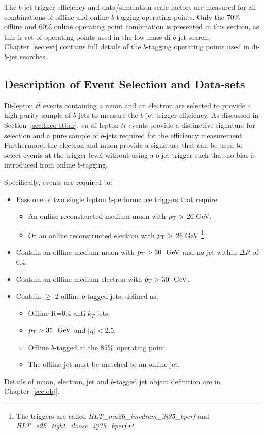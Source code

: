 The $b$-jet trigger efficiency and data/simulation scale factors are measured for all combinations of offline and online $b$-tagging operating points.
Only the 70\% offline and 60\% online operating point combination is presented in this section,
as this is set of operating points used in the low mass di-$b$-jet search;
Chapter~\ref{sec:evt} contains full details of the $b$-tagging operating points used in di-$b$-jet searches.

\subsection{Description of Event Selection and Data-sets}
\label{sec:trig-evtSel}

Di-lepton $t\bar{t}$ events containing a muon and an electron are selected to provide a high purity sample of $b$-jets to measure the $b$-jet trigger efficiency.
As discussed in Section~\ref{sec:theo-ttbar}, 
$e\mu$ di-lepton $t\bar{t}$ events provide a distinctive signature for selection and a pure sample of $b$-jets required for the efficiency measurement.
Furthermore, the electron and muon provide a signature that can be used to select events at the trigger-level without using a $b$-jet trigger
such that no bias is introduced from online $b$-tagging.

\noindent
Specifically, events are required to:
\vspace{-1em}
\begin{itemize}
\item Pass one of two single lepton $b$-performance triggers that require
    \begin{itemize}[label={$-$}]
    \item An online reconstructed medium muon with $p_{\mathrm{T}} >$ 26 GeV.
    \item Or an online reconstructed electron with $p_{\mathrm{T}} >$ 26 GeV \footnote{The triggers are called \textit{HLT\_mu26\_imedium\_2j35\_bperf} and \textit{HLT\_e26\_tight\_iloose\_2j35\_bperf}.}.
    \end{itemize}
\item Contain an offline medium muon with $\pT>30~\GeV$ and no jet within $\Delta R$ of 0.4.
\item Contain an offline medium electron with $\pT>30~\GeV$.
\item Contain $\geq$ 2 offline $b$-tagged jets, defined as:
   \begin{itemize}[label={$-$}]
     \item Offline R=0.4 anti-$k_T$ jets.
     \item $\pT>35~\GeV$ and $|\eta|<2.5$.
     \item Offline $b$-tagged at the 85\%~operating point.
     \item The offline jet must be matched to an online jet.
    \end{itemize}
\end{itemize}
Details of muon, electron, jet and $b$-tagged jet object definition are in Chapter~\ref{sec:obj}.


